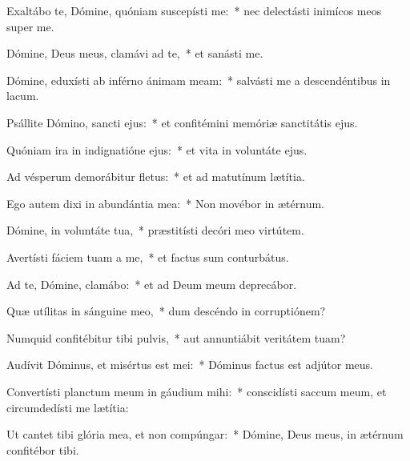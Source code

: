 \item Exaltábo te, Dómine, quóniam suscepísti me:~* nec delectásti inimícos meos super me.

\item Dómine, Deus meus, clamávi ad te,~* et sanásti me.

\item Dómine, eduxísti ab inférno ánimam meam:~* salvásti me a descendéntibus in lacum.

\item Psállite Dómino, sancti ejus:~* et confitémini memóriæ sanctitátis ejus.

\item Quóniam ira in indignatióne ejus:~* et vita in voluntáte ejus.

\item Ad vésperum demorábitur fletus:~* et ad matutínum lætítia.

\item Ego autem dixi in abundántia mea:~* Non movébor in ætérnum.

\item Dómine, in voluntáte tua,~* præstitísti decóri meo virtútem.

\item Avertísti fáciem tuam a me,~* et factus sum conturbátus.

\item Ad te, Dómine, clamábo:~* et ad Deum meum deprecábor.

\item Quæ utílitas in sánguine meo,~* dum descéndo in corruptiónem?

\item Numquid confitébitur tibi pulvis,~* aut annuntiábit veritátem tuam?

\item Audívit Dóminus, et misértus est mei:~* Dóminus factus est adjútor meus.

\item Convertísti planctum meum in gáudium mihi:~* conscidísti saccum meum, et circumdedísti me lætítia:

\item Ut cantet tibi glória mea, et non compúngar:~* Dómine, Deus meus, in ætérnum confitébor tibi.



